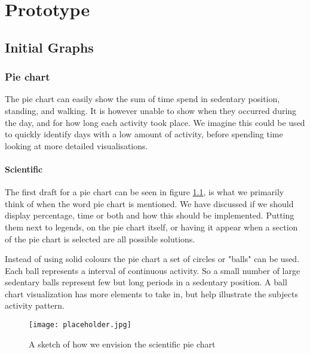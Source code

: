 \chapter{Prototype} %

\label{Chapter5} %


\section{Initial Graphs}

\subsection{Pie chart}
The pie chart can easily show the sum of time spend in sedentary position, standing, and walking. It is however unable to show when they occurred during the day, and for how long each activity took place. We imagine this could be used to quickly identify days with a low amount of activity, before spending time looking at more detailed visualisations.


\subsubsection{Scientific}
The first draft for a pie chart can be seen in figure \ref{fig:scientificPie}, is what we primarily think of when the word pie chart is mentioned. We have discussed if we should display percentage, time or both and how this should be implemented. Putting them next to legends, on the pie chart itself, or having it appear when a section of the pie chart is selected are all possible solutions.

Instead of using solid colours the pie chart a set of circles or "balls" can be used. Each ball represents a interval of continuous activity. So a small number of large sedentary balls represent few but long periods in a sedentary position. A ball chart visualization has more elements to take in, but help illustrate the subjects activity pattern.


\begin{figure}[h!]
	\centering
		\texttt{[image: placeholder.jpg]}
		\caption{\footnotesize A sketch of how we envision the scientific pie chart}
		\label{fig:scientificPie}
\end{figure}

